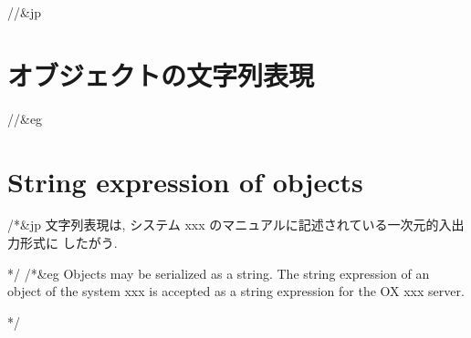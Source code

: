 //&jp \section{ オブジェクトの文字列表現 }
//&eg \section{ String expression of objects}

/*&jp
文字列表現は, システム xxx のマニュアルに記述されている一次元的入出力形式に
したがう.

*/
/*&eg
Objects may be serialized as a string.
The string expression of an object of the system xxx is accepted as
a string expression for the OX xxx server.

*/


